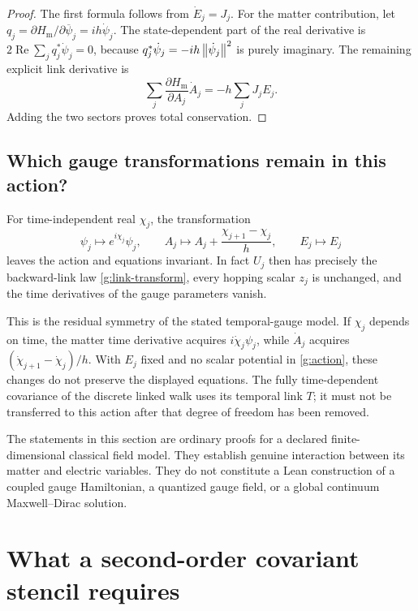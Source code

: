 \begin{proof}
The first formula follows from $\dot E_j=J_j$. For the matter contribution, let $q_j=\partial H_{\mathrm m}/\partial\overline\psi_j=ih\dot\psi_j$. The state-dependent part of the real derivative is
$2\operatorname{Re}\sum_jq_j^*\dot\psi_j=0$, because $q_j^*\dot\psi_j=-ih\left\lVert\dot\psi_j\right\rVert^2$ is purely imaginary. The remaining explicit link derivative is
\[
 \sum_j\frac{\partial H_{\mathrm m}}{\partial A_j}\dot A_j
 =-h\sum_jJ_jE_j.
\]
Adding the two sectors proves total conservation.
\end{proof}

\subsection{Which gauge transformations remain in this action?}

For time-independent real $\chi_j$, the transformation
\begin{equation}\label{g:residual-gauge}
 \psi_j\mapsto e^{i\chi_j}\psi_j,
 \qquad A_j\mapsto A_j+\frac{\chi_{j+1}-\chi_j}{h},
 \qquad E_j\mapsto E_j
\end{equation}
leaves the action and equations invariant. In fact $U_j$ then has precisely the backward-link law \eqref{g:link-transform}, every hopping scalar $z_j$ is unchanged, and the time derivatives of the gauge parameters vanish.

This is the residual symmetry of the stated temporal-gauge model. If $\chi_j$ depends on time, the matter time derivative acquires $i\dot\chi_j\psi_j$, while $\dot A_j$ acquires $(\dot\chi_{j+1}-\dot\chi_j)/h$. With $E_j$ fixed and no scalar potential in \eqref{g:action}, these changes do not preserve the displayed equations. The fully time-dependent covariance of the discrete linked walk uses its temporal link $T$; it must not be transferred to this action after that degree of freedom has been removed.

The statements in this section are ordinary proofs for a declared finite-dimensional classical field model. They establish genuine interaction between its matter and electric variables. They do not constitute a Lean construction of a coupled gauge Hamiltonian, a quantized gauge field, or a global continuum Maxwell--Dirac solution.



\section{What a second-order covariant stencil requires}\label{g:consistency}

